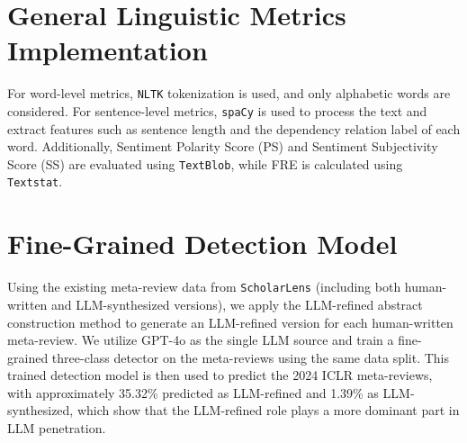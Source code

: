\section{General Linguistic Metrics Implementation}
\label{app:general}
For word-level metrics, \texttt{NLTK} tokenization is used, and only alphabetic words are considered.
For sentence-level metrics, \texttt{spaCy} is used to process the text and extract features such as sentence length and the dependency relation label of each word. 
Additionally, Sentiment Polarity Score (PS) and Sentiment Subjectivity Score (SS) are evaluated using \texttt{TextBlob}, while FRE is calculated using \texttt{Textstat}.




\section{Fine-Grained Detection Model}
\label{app:Fine-Grained}
Using the existing meta-review data from \texttt{ScholarLens} (including both human-written and LLM-synthesized versions), we apply the LLM-refined abstract construction method to generate an LLM-refined version for each human-written meta-review. We utilize GPT-4o as the single LLM source and train a fine-grained three-class detector on the meta-reviews using the same data split. This trained detection model is then used to predict the 2024 ICLR meta-reviews, with approximately 35.32\% predicted as LLM-refined and 1.39\% as LLM-synthesized, which  show that the LLM-refined role plays a more dominant part in LLM penetration.